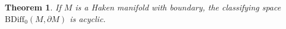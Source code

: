 \documentclass[a4paper]{amsart}
\newtheorem{thm}{Theorem}[section]
\newtheorem{lem}[thm]{Lemma}
\theoremstyle{definition}
\theoremstyle{remark}
\newcommand\Diff{\mathrm{Diff}}
\newcommand\BDiff{\mathrm{BDiff}}
\newcommand{\hcoker}{/\!\!/}
\numberwithin{equation}{section}
\begin{document}
\begin{thm}\label{haken}
If $M$ is a Haken manifold with boundary, the classifying space $\BDiff_0(M,\partial M)$ is acyclic. 
\end{thm}
\end{document}
